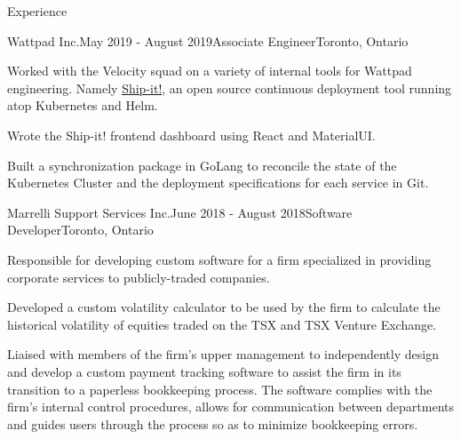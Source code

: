 \documentclass{resume} %
\begin{document}
\begin{rSection}{Experience}
\newpage
\begin{rSubsection}{Wattpad Inc.}{May 2019 - August 2019}{Associate
    Engineer}{Toronto, Ontario}
\item Worked with the Velocity squad on a variety of internal tools for Wattpad engineering.
  Namely \href{https://github.com/Wattpad/ship-it}{Ship-it!}, an open source continuous deployment tool running atop Kubernetes and
  Helm.
\item Wrote the Ship-it! frontend dashboard using React and MaterialUI.
\item Built a synchronization package in GoLang to reconcile the state of the
  Kubernetes Cluster and the deployment specifications for each service in Git.
\end{rSubsection}


\begin{rSubsection}{Marrelli Support Services Inc.}{June 2018 - August
    2018}{Software Developer}{Toronto, Ontario}
\item Responsible for developing custom software for a firm specialized in providing corporate
  services to publicly-traded companies.
\item Developed a custom volatility calculator to be used by the firm to calculate the historical
  volatility of equities traded on the TSX and TSX Venture Exchange.
\item Liaised with members of the firm’s upper management to independently design and
  develop a custom payment tracking software to assist the firm in its transition to a paperless
  bookkeeping process. The software complies with the firm’s internal control procedures,
  allows for communication between departments and guides users through the process so as
  to minimize bookkeeping errors.
\end{rSubsection}

\end{rSection}
\end{document}
